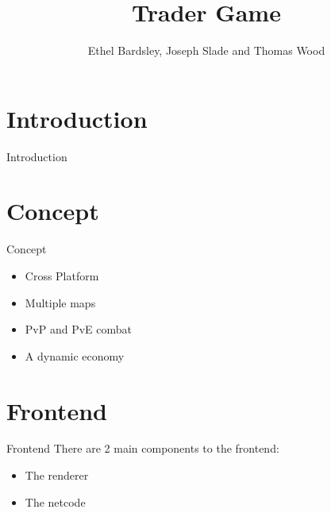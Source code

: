 \documentclass{beamer}
\title{Trader Game}
\author{Ethel Bardsley, Joseph Slade and Thomas Wood}
\begin{document}
\begin{frame}
  \titlepage
\end{frame}

\section{Introduction}
\begin{frame}{Introduction}
\end{frame}

\section{Concept}
\begin{frame}{Concept}
  \begin{itemize}
    \item Cross Platform
    \item Multiple maps
    \item PvP and PvE combat
    \item A dynamic economy
  \end{itemize}
\end{frame}

\section{Frontend}
\begin{frame}{Frontend}
  There are 2 main components to the frontend:
  \begin{itemize}
    \item The renderer
    \item The netcode
  \end{itemize}
\end{frame}
\end{document}
